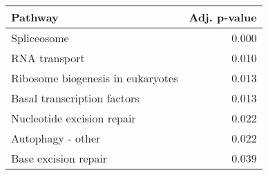 \begin{tabular}{lr}
\toprule
                           Pathway &  Adj. p-value \\
\midrule
                       Spliceosome &         0.000 \\
                     RNA transport &         0.010 \\
 Ribosome biogenesis in eukaryotes &         0.013 \\
       Basal transcription factors &         0.013 \\
        Nucleotide excision repair &         0.022 \\
                 Autophagy - other &         0.022 \\
              Base excision repair &         0.039 \\
\bottomrule
\end{tabular}

